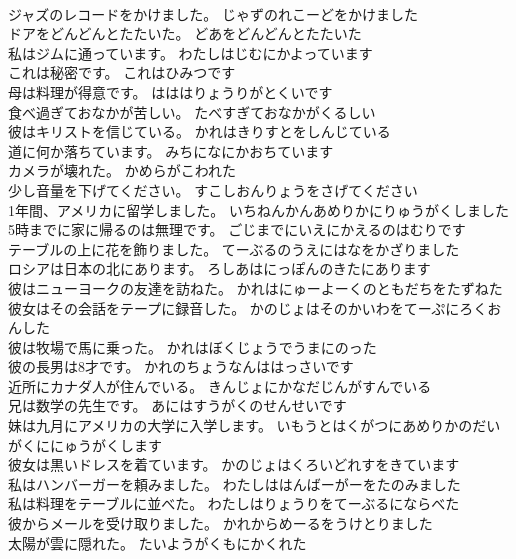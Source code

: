 \documentclass[8pt]{extreport}
\begin{document}
\begin{CJK}{UTF8}{min}
\\	ジャズのレコードをかけました。	じゃずのれこーどをかけました 
\\	ドアをどんどんとたたいた。	どあをどんどんとたたいた 
\\	私はジムに通っています。	わたしはじむにかよっています 
\\	これは秘密です。	これはひみつです 
\\	母は料理が得意です。	はははりょうりがとくいです 
\\	食べ過ぎておなかが苦しい。	たべすぎておなかがくるしい 
\\	彼はキリストを信じている。	かれはきりすとをしんじている 
\\	道に何か落ちています。	みちになにかおちています 
\\	カメラが壊れた。	かめらがこわれた 
\\	少し音量を下げてください。	すこしおんりょうをさげてください 
\\	1年間、アメリカに留学しました。	いちねんかんあめりかにりゅうがくしました 
\\	5時までに家に帰るのは無理です。	ごじまでにいえにかえるのはむりです 
\\	テーブルの上に花を飾りました。	てーぶるのうえにはなをかざりました 
\\	ロシアは日本の北にあります。	ろしあはにっぽんのきたにあります 
\\	彼はニューヨークの友達を訪ねた。	かれはにゅーよーくのともだちをたずねた 
\\	彼女はその会話をテープに録音した。	かのじょはそのかいわをてーぷにろくおんした 
\\	彼は牧場で馬に乗った。	かれはぼくじょうでうまにのった 
\\	彼の長男は8才です。	かれのちょうなんははっさいです 
\\	近所にカナダ人が住んでいる。	きんじょにかなだじんがすんでいる 
\\	兄は数学の先生です。	あにはすうがくのせんせいです 
\\	妹は九月にアメリカの大学に入学します。	いもうとはくがつにあめりかのだいがくににゅうがくします 
\\	彼女は黒いドレスを着ています。	かのじょはくろいどれすをきています 
\\	私はハンバーガーを頼みました。	わたしははんばーがーをたのみました 
\\	私は料理をテーブルに並べた。	わたしはりょうりをてーぶるにならべた 
\\	彼からメールを受け取りました。	かれからめーるをうけとりました 
\\	太陽が雲に隠れた。	たいようがくもにかくれた 

\end{CJK}
\end{document}
